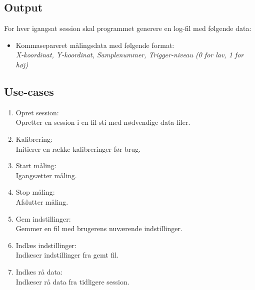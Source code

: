 \documentclass[kravspec.tex]{subfiles}
\begin{document}
\subsection{Output}
For hver igangsat session skal programmet generere en log-fil med følgende data:
\indent \begin{itemize}

	\item 	Kommasepareret målingsdata med følgende format: \\
	\textit{X-koordinat, Y-koordinat, Samplenummer, Trigger-niveau (0 for lav, 1 for høj)} 
\end{itemize}

\subsection{Use-cases}	
\label{usec}
\begin{enumerate}
	\item Opret session: \\Opretter en session i en fil-sti med nødvendige data-filer. 
	\item Kalibrering: \\Initierer en række kalibreringer før brug. 
	\item Start måling: \\Igangsætter måling.
	\item Stop måling: \\Afslutter måling.
	\item Gem indstillinger: \\Gemmer en fil med brugerens nuværende indstillinger.
	\item Indlæs indstillinger: \\Indlæser indstillinger fra gemt fil.
	\item Indlæs rå data: \\Indlæser rå data fra tidligere session. 
\end{enumerate}
\end{document}

